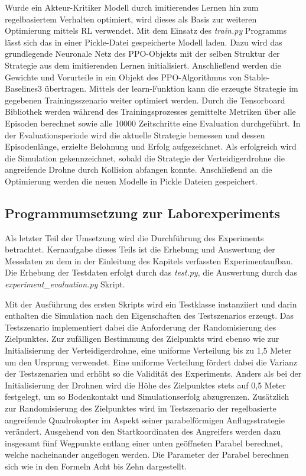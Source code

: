 Wurde ein Akteur-Kritiker Modell durch imitierendes Lernen hin zum regelbasiertem Verhalten optimiert, wird dieses als Basis zur weiteren Optimierung mittels RL verwendet.
Mit dem Einsatz des \textit{train.py} Programms lässt sich das in einer Pickle-Datei gespeicherte Modell laden.
Dazu wird das grundlegende Neuronale Netz des PPO-Objekts mit der selben Struktur der Strategie aus dem imitierenden Lernen initialisiert. 
Anschließend werden die Gewichte und Vorurteile in ein Objekt des PPO-Algorithmus von Stable-Baselines3 übertragen.
Mittels der learn-Funktion kann die erzeugte Strategie im gegebenen Trainingsszenario weiter optimiert werden.
Durch die Tensorboard Bibliothek werden während des Trainingsprozesses gemittelte Metriken über alle Episoden berechnet sowie alle 10000 Zeitschritte eine Evaluation durchgeführt.
In der Evaluationsperiode wird die aktuelle Strategie bemessen und dessen Episodenlänge, erzielte Belohnung und Erfolg aufgezeichnet.
Als erfolgreich wird die Simulation gekennzeichnet, sobald die Strategie der Verteidigerdrohne die angreifende Drohne durch Kollision abfangen konnte.
Anschließend an die Optimierung werden die neuen Modelle in Pickle Dateien gespeichert. 

\subsection{Programmumsetzung zur Laborexperiments}

Als letzter Teil der Umsetzung wird die Durchführung des Experiments betrachtet.
Kernaufgabe dieses Teils ist die Erhebung und Auswertung der Messdaten zu dem in der Einleitung des Kapitels verfassten Experimentaufbau.
Die Erhebung der Testdaten erfolgt durch das \textit{test.py}, die Auswertung durch das \textit{experiment\_evaluation.py} Skript.

Mit der Ausführung des ersten Skripts wird ein Testklasse instanziiert und darin enthalten die Simulation nach den Eigenschaften des Testszenarios erzeugt.
Das Testszenario implementiert dabei die Anforderung der Randomisierung des Zielpunktes.
Zur zufälligen Bestimmung des Zielpunkts wird ebenso wie zur Initialisierung der Verteidigerdrohne, eine uniforme Verteilung bis zu 1,5 Meter um den Ursprung verwendet.
Eine uniforme Verteilung fördert dabei die Varianz der Testszenarien und erhöht so die Validität des Experiments.
Anders als bei der Initialisierung der Drohnen wird die Höhe des Zielpunktes stets auf 0,5 Meter festgelegt, um so Bodenkontakt und Simulationserfolg abzugrenzen.
Zusätzlich zur Randomisierung des Zielpunktes wird im Testszenario der regelbasierte angreifende Quadrokopter im Aspekt seiner parabelförmigen Anflugsstrategie verändert.
Ausgehend von den Startkoordinaten des Angreifers werden dazu insgesamt fünf Wegpunkte entlang einer unten geöffneten Parabel berechnet, welche nacheinander angeflogen werden.
Die Parameter der Parabel berechnen sich wie in den Formeln Acht bis Zehn dargestellt.

